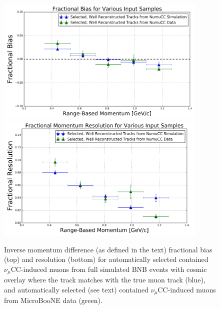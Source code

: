 \documentclass[a4paper,11pt]{article}
\begin{document}



\begin{figure}
\centering
	\includegraphics[width=0.9\textwidth]{Figures/MCS_range_bias_multiplesamples_publicplot.png}
	\includegraphics[width=0.9\textwidth]{Figures/MCS_range_resolution_multiplesamples_publicplot.png}
\caption{Inverse momentum difference (as defined in the text) fractional bias (top) and resolution (bottom) for automatically selected contained $\nu_\mu$CC-induced muons from full simulated BNB events with cosmic overlay where the track matches with the true muon track (blue), and automatically selected (see text) contained $\nu_\mu$CC-induced muons from MicroBooNE data (green).}\label{MCS_range_bias_resolution_DataRecoTrack_fig}
\end{figure}
\end{document}
